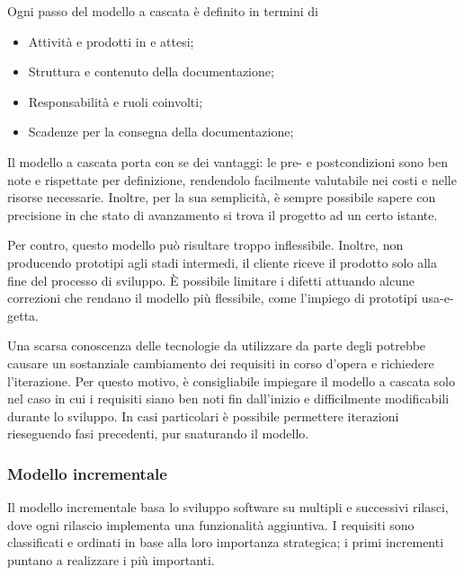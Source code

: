 Ogni passo del modello a cascata è definito in termini di
\begin{itemize}
	\item Attività e prodotti in  e  attesi;
	\item Struttura e contenuto della documentazione;
	\item Responsabilità e ruoli coinvolti;
	\item Scadenze per la consegna della documentazione;
\end{itemize}

Il modello a cascata porta con se dei vantaggi: le pre- e postcondizioni sono ben note e rispettate per definizione, rendendolo facilmente valutabile nei costi e nelle risorse necessarie. Inoltre, per la sua semplicità, è sempre possibile sapere con precisione in che stato di avanzamento si trova il progetto ad un certo istante.

Per contro, questo modello può risultare troppo inflessibile. Inoltre, non producendo prototipi agli stadi intermedi, il cliente riceve il prodotto solo alla fine del processo di sviluppo. È possibile limitare i difetti attuando alcune correzioni che rendano il modello più flessibile, come l'impiego di prototipi usa-e-getta. 

Una scarsa conoscenza delle tecnologie da utilizzare da parte degli  potrebbe causare un sostanziale cambiamento dei requisiti in corso d'opera e richiedere l'iterazione. Per questo motivo, è consigliabile impiegare il modello a cascata solo nel caso in cui i requisiti siano ben noti fin dall'inizio e difficilmente modificabili durante lo sviluppo. In casi particolari è possibile permettere iterazioni rieseguendo fasi precedenti, pur snaturando il modello.


\subsubsection{Modello incrementale}
Il modello incrementale basa lo sviluppo software su multipli e successivi rilasci, dove ogni rilascio implementa una funzionalità aggiuntiva. I requisiti sono classificati e ordinati in base alla loro importanza strategica; i primi incrementi puntano a realizzare i più importanti.

